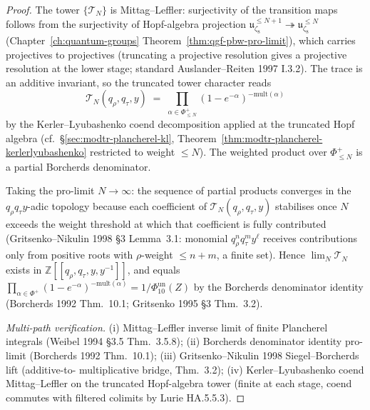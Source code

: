 \begin{proof}
The tower $\{\mathcal T_N\}$ is Mittag--Leffler: surjectivity of the
transition maps follows from the surjectivity of Hopf-algebra
projection $\mathfrak u_{\zeta_8}^{\leq N+1}\twoheadrightarrow
\mathfrak u_{\zeta_8}^{\leq N}$
(Chapter~\ref{ch:quantum-groups}
Theorem~\ref{thm:qgf-pbw-pro-limit}), which carries projectives
to projectives (truncating a projective resolution gives a projective
resolution at the lower stage; standard Auslander--Reiten 1997 I.3.2).
The trace is an additive invariant, so the truncated tower
character reads
\[
 \mathcal T_N(q_\rho, q_\tau, y)
 \;=\;
 \prod_{\alpha\in\Phi^+_{\leq N}}
 (1 - e^{-\alpha})^{-\mathrm{mult}(\alpha)}
\]
by the Kerler--Lyubashenko coend decomposition applied at the
truncated Hopf algebra (cf.\ \S\ref{sec:modtr-plancherel-kl},
Theorem~\ref{thm:modtr-plancherel-kerlerlyubashenko} restricted
to weight $\leq N$). The weighted product over $\Phi^+_{\leq N}$ is a
partial Borcherds denominator.

Taking the pro-limit $N\to\infty$: the sequence of partial products
converges in the $q_\rho q_\tau y$-adic topology because each
coefficient of $\mathcal T_N(q_\rho, q_\tau, y)$ stabilises once $N$
exceeds the weight threshold at which that coefficient is fully
contributed (Gritsenko--Nikulin 1998 \S3 Lemma~3.1:
monomial $q_\rho^n q_\tau^m y^\ell$ receives contributions only from
positive roots with $\rho$-weight $\leq n + m$, a finite set).
Hence $\lim_N\mathcal T_N$ exists in
$\mathbb Z[[q_\rho, q_\tau, y, y^{-1}]]$, and equals
$\prod_{\alpha\in\Phi^+}(1-e^{-\alpha})^{-\mathrm{mult}(\alpha)}
= 1/\Phi_{10}^{\mathrm{un}}(Z)$ by the Borcherds denominator identity
(Borcherds 1992 Thm.~10.1; Gritsenko 1995 \S3 Thm.~3.2).

\emph{Multi-path verification.}
(i) Mittag--Leffler inverse limit of finite Plancherel integrals
 (Weibel 1994 \S3.5 Thm.~3.5.8);
(ii) Borcherds denominator identity pro-limit
 (Borcherds 1992 Thm.~10.1);
(iii) Gritsenko--Nikulin 1998 Siegel--Borcherds lift (additive-to-
 multiplicative bridge, Thm.~3.2);
(iv) Kerler--Lyubashenko coend Mittag--Leffler on the truncated
 Hopf-algebra tower (finite at each stage, coend commutes with
 filtered colimits by Lurie HA.5.5.3).
\end{proof}

